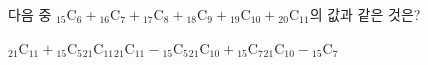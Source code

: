 다음 중 ${}_{15}\mathrm{C}_6+{}_{16}\mathrm{C}_7+{}_{17}\mathrm{C}_8+{}_{18}\mathrm{C}_9+{}_{19}\mathrm{C}_{10}+{}_{20}\mathrm{C}_{11}$의 값과 같은 것은?
\begin{choices32}{${}_{21}\mathrm{C}_{11}+{}_{15}\mathrm{C}_5$}{${}_{21}\mathrm{C}_{11}$}{${}_{21}\mathrm{C}_{11}-{}_{15}\mathrm{C}_5$}{${}_{21}\mathrm{C}_{10}+{}_{15}\mathrm{C}_7$}{${}_{21}\mathrm{C}_{10}-{}_{15}\mathrm{C}_7$}\end{choices32}
